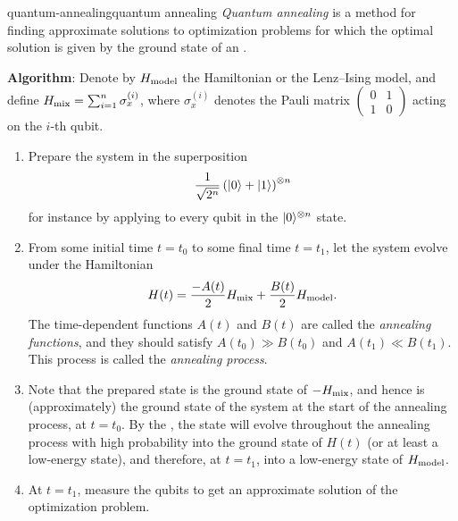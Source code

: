 \begin{topic}{quantum-annealing}{quantum annealing}
    \emph{Quantum annealing} is a method for finding approximate solutions to optimization problems for which the optimal solution is given by the ground state of an  .

    \textbf{Algorithm}: Denote by $H_\textup{model}$ the Hamiltonian or the Lenz--Ising model, and define $H_\textup{mix} = \sum_{i = 1}^{n} \sigma_x^{(i)}$, where $\sigma_x^{(i)}$ denotes the Pauli matrix $\left( \begin{smallmatrix} 0 & 1 \\ 1 & 0 \end{smallmatrix} \right)$ acting on the $i$-th qubit.
    \begin{enumerate}[label=(\arabic*)]
        \item Prepare the system in the superposition
        \[ \frac{1}{\sqrt{2^n}} \left( |0\rangle + |1\rangle \right)^{\otimes n} \]
        for instance by applying  to every qubit in the $|0\rangle^{\otimes n}$ state.
        \item From some initial time $t = t_0$ to some final time $t = t_1$, let the system evolve under the Hamiltonian
        \[ H(t) = \frac{-A(t)}{2} H_\textup{mix} + \frac{B(t)}{2} H_\textup{model} . \]
        The time-dependent functions $A(t)$ and $B(t)$ are called the \textit{annealing functions}, and they should satisfy $A(t_0) \gg B(t_0)$ and $A(t_1) \ll B(t_1)$. This process is called the \textit{annealing process}.
        \item Note that the prepared state is the ground state of $- H_\textup{mix}$, and hence is (approximately) the ground state of the system at the start of the annealing process, at $t = t_0$. By the , the state will evolve throughout the annealing process with high probability into the ground state of $H(t)$ (or at least a low-energy state), and therefore, at $t = t_1$, into a low-energy state of $H_\textup{model}$.
        \item At $t = t_1$, measure the qubits to get an approximate solution of the optimization problem.
    \end{enumerate}
\end{topic}

